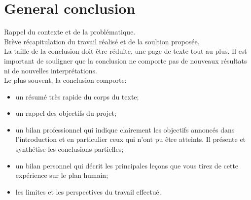 \chapter{General conclusion}

Rappel du contexte et de la problématique.\\
Brève récapitulation du travail réalisé et de la soultion proposée.\\

La taille de la conclusion doit être réduite, une page de texte tout au plus. Il est important de souligner que la conclusion ne comporte pas de nouveaux résultats ni de nouvelles interprétations.\\

Le plus souvent, la conclusion comporte:

\begin{itemize}[label=\textbullet,font=\normalsize]
\item un résumé très rapide du corps du texte;
\item un rappel des objectifs du projet;
\item un bilan professionnel qui indique clairement les objectifs annoncés dans l’introduction et en particulier ceux qui n’ont pu être atteints. Il présente et synthétise les conclusions partielles;
\item un bilan personnel qui décrit les principales leçons que vous tirez de cette expérience sur le plan humain;
\item les limites et les perspectives du travail effectué.
\end{itemize}